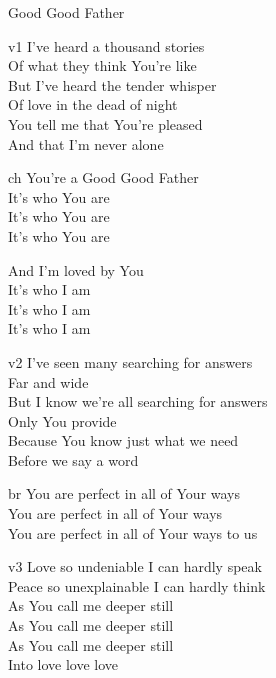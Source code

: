 \begin{song}{Good Good Father}


    \begin{songframe}{v1}
    I've heard a thousand stories \\
    Of what they think You’re like \\
    But I've heard the tender whisper \\
    Of love in the dead of night \\
    You tell me that You’re pleased \\
    And that I'm never alone
    \end{songframe}


    \begin{songframe}{ch}
    You're a Good Good Father \\
    It's who You are \\
    It's who You are \\
    It's who You are

    And I'm loved by You \\
    It's who I am \\
    It's who I am \\
    It's who I am
    \end{songframe}

    \begin{songframe}{v2}
    I've seen many searching for answers \\
    Far and wide \\
    But I know we're all searching for answers \\
    Only You provide \\
    Because You know just what we need \\
    Before we say a word
    \end{songframe}

    \begin{songframe}{br}
    You are perfect in all of Your ways \\
    You are perfect in all of Your ways \\
    You are perfect in all of Your ways to us
    \end{songframe}

    \begin{songframe}{v3}
    Love so undeniable I can hardly speak \\
    Peace so unexplainable I can hardly think \\
    As You call me deeper still \\
    As You call me deeper still \\
    As You call me deeper still \\
    Into love love love
    \end{songframe}

\end{song}
